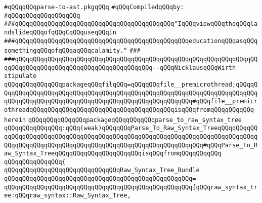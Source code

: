 \label{src/lib/c-kit/src/ast/parse-to-ast.pkg}
\verb|#qQQqqQQqparse-to-ast.pkgqQQq|\newline
\newline
\verb|#qQQqCompiledqQQqby:|\newline
\verb|#qQQqqQQqqQQqqQQqqQQq|\newline
\newline
\verb|###qQQqqQQqqQQqqQQqqQQqqQQqqQQqqQQqqQQqqQQqqQQq"IqQQqviewqQQqtheqQQqlandslideqQQqofqQQqCqQQquseqQQqin|\newline
\verb|###qQQqqQQqqQQqqQQqqQQqqQQqqQQqqQQqqQQqqQQqqQQqqQQqeducationqQQqasqQQqsomethingqQQqofqQQqaqQQqcalamity."|\newline
\verb|###|\newline
\verb|###qQQqqQQqqQQqqQQqqQQqqQQqqQQqqQQqqQQqqQQqqQQqqQQqqQQqqQQqqQQqqQQqqQQqqQQqqQQqqQQqqQQqqQQqqQQqqQQqqQQqqQQqqQQq--qQQqNicklausqQQqWirth|\newline
\newline
\newline
\verb|stipulate|\newline
\verb|qQQqqQQqqQQqqQQqpackageqQQqfilqQQq=qQQqqQQqfile__premicrothread;qQQqqQQqqQQqqQQqqQQqqQQqqQQqqQQqqQQqqQQqqQQqqQQqqQQqqQQqqQQqqQQqqQQqqQQqqQQqqQQqqQQqqQQqqQQqqQQqqQQqqQQqqQQqqQQqqQQqqQQqqQQqqQQq#qQQqfile__premicrothreadqQQqqQQqqQQqqQQqqQQqqQQqqQQqqQQqqQQqqQQqisqQQqfromqQQqqQQqqQQq|\newline
\verb|herein|\newline
\newline
\verb|qQQqqQQqqQQqqQQqpackageqQQqqQQqqQQqparse_to_raw_syntax_tree|\newline
\verb|qQQqqQQqqQQqqQQq:qQQq(weak)qQQqqQQqParse_To_Raw_Syntax_TreeqQQqqQQqqQQqqQQqqQQqqQQqqQQqqQQqqQQqqQQqqQQqqQQqqQQqqQQqqQQqqQQqqQQqqQQqqQQqqQQqqQQqqQQqqQQqqQQqqQQqqQQqqQQqqQQqqQQqqQQqqQQqqQQqqQQqqQQq#qQQqParse_To_Raw_Syntax_TreeqQQqqQQqqQQqqQQqqQQqqQQqisqQQqfromqQQqqQQqqQQq|\newline
\verb|qQQqqQQqqQQqqQQq{|\newline
\verb|qQQqqQQqqQQqqQQqqQQqqQQqqQQqqQQqRaw_Syntax_Tree_Bundle|\newline
\verb|qQQqqQQqqQQqqQQqqQQqqQQqqQQqqQQqqQQqqQQqqQQqqQQqqQQq=|\newline
\verb|qQQqqQQqqQQqqQQqqQQqqQQqqQQqqQQqqQQqqQQqqQQqqQQqqQQq{qQQqraw_syntax_tree:qQQqraw_syntax::Raw_Syntax_Tree,|\newline
